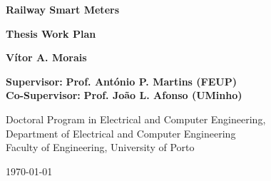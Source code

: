 \vspace{25mm}
\begin{addmargin}[2cm]{1mm}
	\begin{center}
		
		\begin{LARGE}
			\textbf{\color{FEUP} Railway Smart Meters\\}
		\end{LARGE}
		
		\vspace{5mm}
		
		\textbf{Thesis Work Plan\\}
		
		\vspace{30mm}
		
		\textbf{\Large Vítor A. Morais} \\
		
		\vspace{5mm}
		
		\textbf{Supervisor:} \textbf{Prof. António P. Martins (FEUP)} \\
		\textbf{Co-Supervisor:} \textbf{Prof. João L. Afonso (UMinho)}
		
		\vfill %
		
		\small{Doctoral Program in Electrical and Computer Engineering,}\\
		\small{Department of Electrical and Computer Engineering}\\
		\small{Faculty of Engineering, University of Porto\\}
		\small{\today \par} %
		
	\end{center}
	
\end{addmargin}


\clearpage %

%
\cleardoublepage
{}
\tableofcontents
\cleardoublepage
{}
\listoffigures
\cleardoublepage
{}
\listoftables

